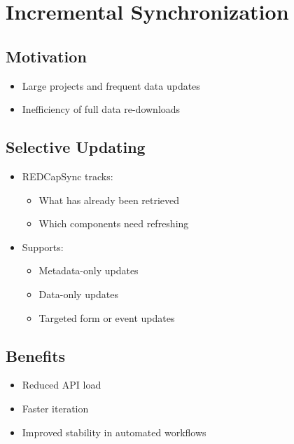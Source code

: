 \section{Incremental Synchronization}\label{incremental-synchronization}

\subsection{Motivation}\label{motivation}

\begin{itemize}
\tightlist
\item
  Large projects and frequent data updates\\
\item
  Inefficiency of full data re-downloads
\end{itemize}

\subsection{Selective Updating}\label{selective-updating}

\begin{itemize}
\tightlist
\item
  REDCapSync tracks:

  \begin{itemize}
  \tightlist
  \item
    What has already been retrieved\\
  \item
    Which components need refreshing\\
  \end{itemize}
\item
  Supports:

  \begin{itemize}
  \tightlist
  \item
    Metadata-only updates\\
  \item
    Data-only updates\\
  \item
    Targeted form or event updates
  \end{itemize}
\end{itemize}

\subsection{Benefits}\label{benefits}

\begin{itemize}
\tightlist
\item
  Reduced API load\\
\item
  Faster iteration\\
\item
  Improved stability in automated workflows
\end{itemize}

